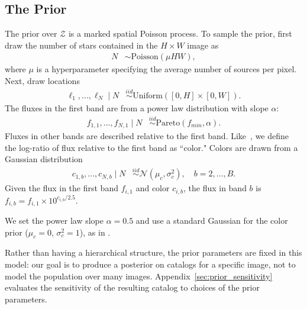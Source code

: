 \subsection{The Prior}
The prior over $\mathcal{Z}$ is a marked spatial Poisson process. To sample the prior, first draw the number of stars contained in the $H\times W$ image as
\begin{align}
	N &\sim \text{Poisson}(\mu HW),
	\label{eq:n_prior}
\end{align}
where $\mu$ is a hyperparameter specifying the average number of sources per pixel.
Next, draw locations
\begin{align}
  \ell_1, ..., \ell_N \mid N &\stackrel{iid}{\sim} \text{Uniform}([0, H] \times [0, W]).
 \end{align}
The fluxes in the first band are from a power law distribution with slope $\alpha$:
\begin{align}
    f_{1, 1}, ..., f_{N,1} \mid N &
    \stackrel{iid}{\sim} \text{Pareto}(f_{min}, \alpha)
    \label{eq:flux_prior}.
\end{align}
Fluxes in other bands are described relative to the first band. Like~\cite{Feder_2019}, we define the log-ratio of flux relative to the first band as ``color." Colors are drawn from a Gaussian distribution
\begin{align}
  c_{1, b}, ..., c_{N,b} \mid N  &
      \stackrel{iid}{\sim} \mathcal{N}(\mu_c, \sigma^2_c), \quad b = 2, ..., B.
\end{align}
Given the flux in the first band $f_{i,1}$ and color $c_{i,b}$,
the flux in band $b$ is  $f_{i,b} = f_{i,1} \times 10^{c_{i,b} / 2.5}$.

We set the power law slope $\alpha = 0.5$ and use a standard Gaussian for the color prior ($\mu_c = 0$, $\sigma^2_c = 1$), as in \cite{Feder_2019}.

Rather than having a hierarchical structure, 
the prior parameters are fixed in this model:
our goal is to produce a posterior on catalogs for a
specific image, not to model the population over many images. 
Appendix~\ref{sec:prior_sensitivity} evaluates the
sensitivity of the resulting catalog to choices of the prior parameters.

